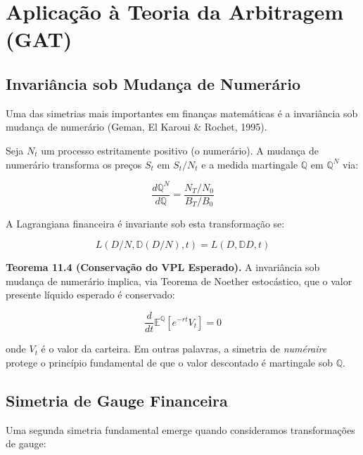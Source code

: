 \section{Aplica\c{c}\~ao \`a Teoria da Arbitragem (GAT)}

\subsection{Invari\^ancia sob Mudan\c{c}a de Numer\'ario}

Uma das simetrias mais importantes em finan\c{c}as matem\'aticas \'e a invari\^ancia sob mudan\c{c}a de numer\'ario (Geman, El Karoui \& Rochet, 1995).

Seja $N_t$ um processo estritamente positivo (o numer\'ario). A mudan\c{c}a de numer\'ario transforma os pre\c{c}os $S_t$ em $S_t/N_t$ e a medida martingale $\mathbb{Q}$ em $\mathbb{Q}^N$ via:

\begin{equation}\label{eq:mudanca-numerario}
\frac{d\mathbb{Q}^N}{d\mathbb{Q}} = \frac{N_T / N_0}{B_T / B_0}
\end{equation}

A Lagrangiana financeira \'e invariante sob esta transforma\c{c}\~ao se:

\begin{equation}\label{eq:invariancia-numerario}
L(D/N, \mathbb{D}(D/N), t) = L(D, \mathbb{D}D, t)
\end{equation}

\smallskip
\noindent\textbf{Teorema 11.4 (Conserva\c{c}\~ao do VPL Esperado).} A invari\^ancia sob mudan\c{c}a de numer\'ario implica, via Teorema de Noether estoc\'astico, que o valor presente l\'iquido esperado \'e conservado:

\begin{equation}\label{eq:conservacao-vpl}
\frac{d}{dt} \mathbb{E}^{\mathbb{Q}}\left[ e^{-rt} V_t \right] = 0
\end{equation}

onde $V_t$ \'e o valor da carteira. Em outras palavras, a simetria de \textit{num\'eraire} protege o princ\'ipio fundamental de que o valor descontado \'e martingale sob $\mathbb{Q}$.

\subsection{Simetria de Gauge Financeira}

Uma segunda simetria fundamental emerge quando consideramos transforma\c{c}\~oes de gauge:

